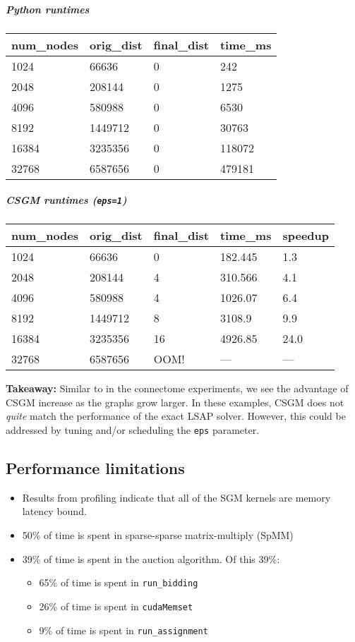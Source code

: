 \documentclass[10pt,oneside]{memoir}
\providecommand{\tightlist}{%
  \setlength{\itemsep}{0pt}\setlength{\parskip}{0pt}}
\let\oldsubparagraph\subparagraph
\renewcommand{\subparagraph}[1]{\oldsubparagraph{#1}\mbox{}}
\begin{document}
\hypertarget{python-runtimes-1}{%
\subparagraph{Python runtimes}\label{python-runtimes-1}}

\begin{longtable}[]{@{}llll@{}}
\toprule
num\_nodes & orig\_dist & final\_dist & time\_ms\tabularnewline
\midrule
\endhead
1024 & 66636 & 0 & 242\tabularnewline
2048 & 208144 & 0 & 1275\tabularnewline
4096 & 580988 & 0 & 6530\tabularnewline
8192 & 1449712 & 0 & 30763\tabularnewline
16384 & 3235356 & 0 & 118072\tabularnewline
32768 & 6587656 & 0 & 479181\tabularnewline
\bottomrule
\end{longtable}

\hypertarget{csgm-runtimes-eps1}{%
\subparagraph{\texorpdfstring{CSGM runtimes
(\texttt{eps=1})}{CSGM runtimes (eps=1)}}\label{csgm-runtimes-eps1}}

\begin{longtable}[]{@{}lllll@{}}
\toprule
num\_nodes & orig\_dist & final\_dist & time\_ms &
speedup\tabularnewline
\midrule
\endhead
1024 & 66636 & 0 & 182.445 & 1.3\tabularnewline
2048 & 208144 & 4 & 310.566 & 4.1\tabularnewline
4096 & 580988 & 4 & 1026.07 & 6.4\tabularnewline
8192 & 1449712 & 8 & 3108.9 & 9.9\tabularnewline
16384 & 3235356 & 16 & 4926.85 & 24.0\tabularnewline
32768 & 6587656 & OOM! & --- & ---\tabularnewline
\bottomrule
\end{longtable}

\textbf{Takeaway:} Similar to in the connectome experiments, we see the
advantage of CSGM increase as the graphs grow larger. In these examples,
CSGM does not \emph{quite} match the performance of the exact LSAP
solver. However, this could be addressed by tuning and/or scheduling the
\texttt{eps} parameter.

\hypertarget{performance-limitations-6}{%
\subsection{Performance limitations}\label{performance-limitations-6}}

\begin{itemize}
\tightlist
\item
  Results from profiling indicate that all of the SGM kernels are memory
  latency bound.
\item
  50\% of time is spent in sparse-sparse matrix-multiply (SpMM)
\item
  39\% of time is spent in the auction algorithm. Of this 39\%:

  \begin{itemize}
  \tightlist
  \item
    65\% of time is spent in \texttt{run\_bidding}
  \item
    26\% of time is spent in \texttt{cudaMemset}
  \item
    9\% of time is spent in \texttt{run\_assignment}
  \end{itemize}
\end{itemize}
\end{document}
